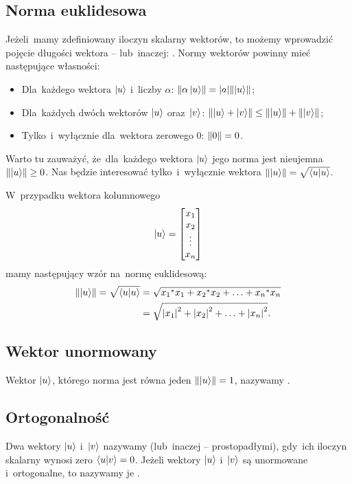 \subsection{Norma euklidesowa}
Jeżeli~mamy zdefiniowany iloczyn skalarny wektorów, to możemy wprowadzić pojęcie
długości wektora -- lub~inaczej: .
Normy wektorów powinny mieć następujące własności:
\begin{itemize}
	\item Dla~każdego wektora $\ket{u}$ i~liczby $\alpha$: $\norm{\alpha\ket{u}}=|a|\norm{\ket{u}}$;
	\item Dla~każdych dwóch wektorów $\ket{u}$ oraz~$\ket{v}$: $\norm{\ket{u}+\ket{v}}\leq \norm{\ket{u}}+\norm{\ket{v}}$;
	\item Tylko~i~wyłącznie dla~wektora zerowego $0$: $\norm{0}=0$.
\end{itemize}
Warto tu zauważyć, że~dla~każdego wektora $\ket{u}$ jego norma jest nieujemna
$\norm{\ket{u}}\geq 0$.
Nas będzie interesować tylko~i~wyłącznie  wektora
$\norm{\ket{u}}=\sqrt{\braket{u}{u}}$.

W~przypadku wektora kolumnowego
$$
	\ket{u}=
	\begin{bmatrix}
		x_1    \\
		x_2    \\
		\vdots \\
		x_{n}  \\
	\end{bmatrix}
$$
mamy następujący wzór na~normę euklidesową:
\begin{equation*}
	\begin{split}
		\norm{\ket{u}}=\sqrt{\braket{u}{u}}
		& = \sqrt{{x_1}^*x_1 + {x_2}^*x_2 + \ldots + {x_n}^*x_n}  \\
		&= \sqrt{\abs{x_1}^2 + \abs{x_2}^2 + \ldots + \abs{x_n}^2}.
	\end{split}
\end{equation*}
\subsection{Wektor unormowany}
Wektor $\ket{u}$, którego norma jest równa jeden $\norm{\ket{u}}=1$, nazywamy
.

\subsection{Ortogonalność}
Dwa wektory $\ket{u}$ i~$\ket{v}$ nazywamy
 (lub~inaczej --
prostopadłymi), gdy~ich iloczyn skalarny wynosi zero $\braket{u}{v}=0$. Jeżeli
wektory $\ket{u}$ i~$\ket{v}$ są unormowane i~ortogonalne, to nazywamy je
.

